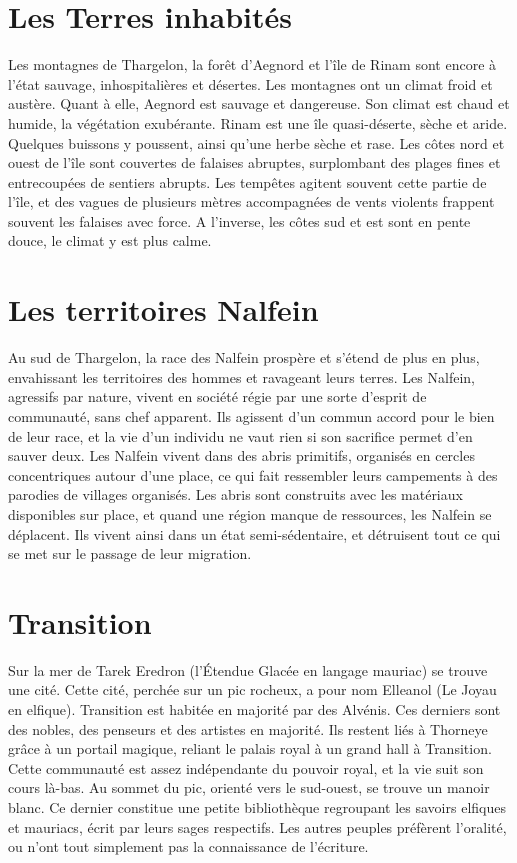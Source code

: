 \section{Les Terres inhabités}
Les montagnes de Thargelon, la forêt d'Aegnord et l'île de Rinam sont encore à l'état sauvage, inhospitalières et désertes. Les montagnes ont un climat froid et austère. Quant à elle, Aegnord est sauvage et dangereuse. Son climat est chaud et humide, la végétation exubérante. 
\newline
Rinam est une île quasi-déserte, sèche et aride. Quelques buissons y poussent, ainsi qu'une herbe sèche et rase. Les côtes nord et ouest de l'île sont couvertes de falaises abruptes, surplombant des plages fines et entrecoupées de sentiers abrupts. Les tempêtes agitent souvent cette partie de l'île, et des vagues de plusieurs mètres accompagnées de vents violents frappent souvent les falaises avec force. A l'inverse, les côtes sud et est sont en pente douce, le climat y est plus calme.
\section{Les territoires Nalfein}
Au sud de Thargelon, la race des Nalfein prospère et s'étend de plus en plus, envahissant les territoires des hommes et ravageant leurs terres. Les Nalfein, agressifs par nature, vivent en société régie par une sorte d'esprit de communauté, sans chef apparent. Ils agissent d'un commun accord pour le bien de leur race, et la vie d'un individu ne vaut rien si son sacrifice permet d'en sauver deux. Les Nalfein vivent dans des abris primitifs, organisés en cercles concentriques autour d'une place, ce qui fait ressembler leurs campements à des parodies de villages organisés. Les abris sont construits avec les matériaux disponibles sur place, et quand une région manque de ressources, les Nalfein se déplacent. Ils vivent ainsi dans un état semi-sédentaire, et détruisent tout ce qui se met sur le passage de leur migration.
\section{Transition}
Sur la mer de Tarek Eredron (l'Étendue Glacée en langage mauriac) se trouve une cité. Cette cité, perchée sur un pic rocheux, a pour nom Elleanol (Le Joyau en elfique). Transition est habitée en majorité par des Alvénis. Ces derniers sont des nobles, des penseurs et des artistes en majorité. Ils restent liés à Thorneye grâce à un portail magique, reliant le palais royal à un grand hall à Transition. Cette communauté est assez indépendante du pouvoir royal, et la vie suit son cours là-bas.
\newline
Au sommet du pic, orienté vers le sud-ouest, se trouve un manoir blanc. Ce dernier constitue une petite bibliothèque regroupant les savoirs elfiques et mauriacs, écrit par leurs sages respectifs. Les autres peuples préfèrent l'oralité, ou n'ont tout simplement pas la connaissance de l'écriture.